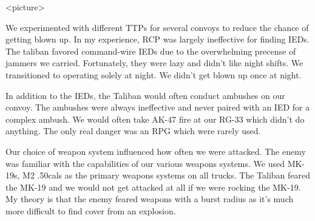 \documentclass[]{article}
\begin{document}
\textless{}picture\textgreater{}

We experimented with different TTPs for several convoys to reduce the
chance of getting blown up. In my experience, RCP was largely
ineffective for finding IEDs. The taliban favored command-wire IEDs due
to the overwhelming precense of jammers we carried. Fortunately, they
were lazy and didn't like night shifts. We transitioned to operating
solely at night. We didn't get blown up once at night.

In addition to the IEDs, the Taliban would often conduct ambushes on our
convoy. The ambushes were always ineffective and never paired with an
IED for a complex ambush. We would often take AK-47 fire at our RG-33
which didn't do anything. The only real danger was an RPG which were
rarely used.

Our choice of weapon system influenced how often we were attacked. The
enemy was familiar with the capabilities of our various weapons systems.
We used MK-19s, M2 .50cals as the primary weapons systems on all trucks.
The Taliban feared the MK-19 and we would not get attacked at all if we
were rocking the MK-19. My theory is that the enemy feared weapons with
a burst radius as it's much more difficult to find cover from an
explosion.
\end{document}
